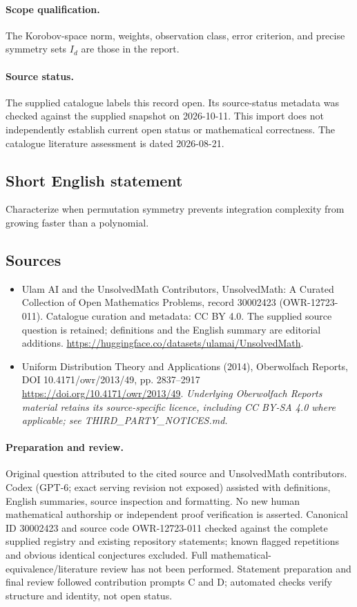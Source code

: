 \documentclass[11pt]{article}
\begin{document}
\paragraph{Scope qualification.}
The Korobov-space norm, weights, observation class, error criterion, and precise symmetry sets $I_d$ are those in the report.
\paragraph{Source status.}
The supplied catalogue labels this record open. Its source-status metadata was checked against the supplied snapshot on 2026-10-11. This import does not independently establish current open status or mathematical correctness. The catalogue literature assessment is dated 2026-08-21.
\subsection{Short English statement}
Characterize when permutation symmetry prevents integration complexity from growing faster than a polynomial.
\subsection{Sources}
\begin{itemize}
\item[S1] Ulam AI and the UnsolvedMath Contributors, UnsolvedMath: A Curated Collection of Open Mathematics Problems, record 30002423 (OWR-12723-011). Catalogue curation and metadata: CC BY 4.0. The supplied source question is retained; definitions and the English summary are editorial additions.
\url{https://huggingface.co/datasets/ulamai/UnsolvedMath}.
\item[S2] Uniform Distribution Theory and Applications (2014), Oberwolfach Reports, DOI 10.4171/owr/2013/49, pp. 2837--2917
\url{https://doi.org/10.4171/owr/2013/49}.
\textit{Underlying Oberwolfach Reports material retains its source-specific licence, including CC BY-SA 4.0 where applicable; see THIRD\_PARTY\_NOTICES.md.}
\end{itemize}
\paragraph{Preparation and review.}
Original question attributed to the cited source and UnsolvedMath contributors. Codex (GPT-6; exact serving revision not exposed) assisted with definitions, English summaries, source inspection and formatting. No new human mathematical authorship or independent proof verification is asserted. Canonical ID 30002423 and source code OWR-12723-011 checked against the complete supplied registry and existing repository statements; known flagged repetitions and obvious identical conjectures excluded. Full mathematical-equivalence/literature review has not been performed. Statement preparation and final review followed contribution prompts C and D; automated checks verify structure and identity, not open status.
\label{end:30002423}
\end{document}
